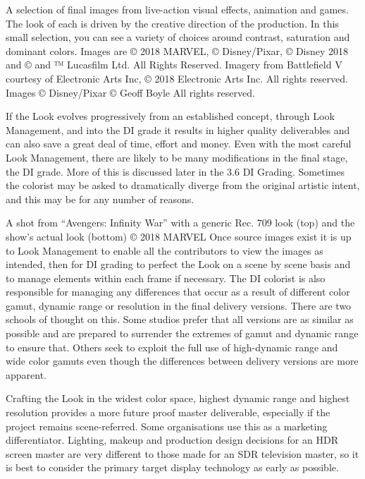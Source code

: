A selection of final images from live-action visual effects, animation and games. The look of each is driven by the creative direction of the production. In this small selection, you can see a variety of choices around contrast, saturation and dominant colors.
Images are © 2018 MARVEL, © Disney/Pixar,  © Disney 2018 and © and ™ Lucasfilm Ltd. All Rights Reserved. Imagery from Battlefield V courtesy of Electronic Arts Inc, © 2018 Electronic Arts Inc. All rights reserved. Images © Disney/Pixar © Geoff Boyle All rights reserved.

If the Look evolves progressively from an established concept, through Look Management, and into the DI grade it results in higher quality deliverables and can also save a great deal of time, effort and money. Even with the most careful Look Management, there are likely to be many modifications in the final stage, the DI grade. More of this is discussed later in the 3.6 DI Grading. Sometimes the colorist may be asked to dramatically diverge from the original artistic intent, and this may be for any number of reasons.





A shot from “Avengers: Infinity War” with a generic Rec. 709 look (top) and the show’s actual look (bottom)
© 2018 MARVEL
Once source images exist it is up to Look Management to enable all the contributors to view the images as intended, then for DI grading to perfect the Look on a scene by scene basis and to manage elements within each frame if necessary. The DI colorist is also responsible for managing any differences that occur as a result of different color gamut, dynamic range or resolution in the final delivery versions. There are two schools of thought on this. Some studios prefer that all versions are as similar as possible and are prepared to surrender the extremes of gamut and dynamic range to ensure that. Others seek to exploit the full use of high-dynamic range and wide color gamuts even though the differences between delivery versions are more apparent.

Crafting the Look in the widest color space, highest dynamic range and highest resolution provides a more future proof master deliverable, especially if the project remains scene-referred. Some organisations use this as a marketing differentiator. Lighting, makeup and production design decisions for an HDR screen master are very different to those made for an SDR television master, so it is best to consider the primary target display technology as early as possible.



